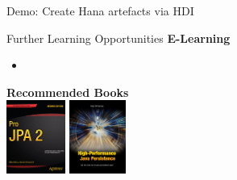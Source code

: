 \begin{frame}[fragile]{Demo: Create Hana artefacts via HDI}
\begin{figure}
\end{figure}
\end{frame}


\begin{frame}{Further Learning Opportunities}
\textbf{E-Learning}
	\begin{itemize}
	\item {}
	\end{itemize}
\vfill
\textbf{Recommended Books}\\
\includegraphics[height=24mm]{../ConnectDatabase/images/ProJPA_2Edition}   
\hspace{3mm}
\includegraphics[height=24mm]{../ConnectDatabase/images/HighPerformanceJavaPersistence}

\end{frame}

